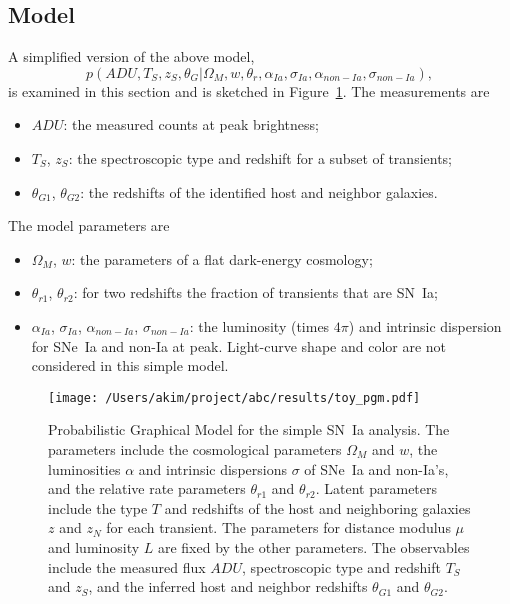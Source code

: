 \documentclass[preprint]{elsarticle}
\begin{document}
\subsection{Model}
\label{example:sec}
A simplified version of the above model,
\begin{equation}
p(\mathit{ADU}, {{T}}_S,{{z}}_S, \theta_G|  \Omega_M, w, \theta_r,\alpha_{Ia},\sigma_{Ia}, \alpha_{\mathit{non-Ia}},\sigma_{\mathit{non-Ia}}),
\end{equation}
is examined in this section and is sketched in Figure~\ref{toypgm:fig}.
The measurements are
\begin{itemize}
\item $\mathit{ADU}$: the measured counts at peak brightness;
\item ${{T}}_S$, ${{z}}_S$: the spectroscopic type and redshift for a subset of transients;
\item $\theta_{G1}$, $\theta_{G2}$: the redshifts of the identified host and neighbor
galaxies.
\end{itemize}
The model parameters are
\begin{itemize}
\item $\Omega_M$, $w$: the parameters of a flat dark-energy cosmology;
\item $\theta_{r1}$, $\theta_{r2}$:  for two redshifts the fraction of transients that are SN~Ia;
\item $\alpha_{Ia}$, $\sigma_{Ia}$, $\alpha_{\mathit{non-Ia}}$, $\sigma_{\mathit{non-Ia}}$:
the luminosity (times $4\pi$) and intrinsic dispersion for SNe~Ia and non-Ia at peak.
Light-curve shape and color are not considered in this simple model.
\end{itemize}

\begin{figure}[htbp] %
   \centering
   \texttt{[image: /Users/akim/project/abc/results/toy\_pgm.pdf]} 
   \caption{Probabilistic Graphical Model for the simple SN~Ia analysis. The
   parameters include the cosmological parameters $\Omega_M$ and $w$,
   the luminosities $\alpha$ and intrinsic dispersions $\sigma$ of SNe~Ia and non-Ia's,
   and the relative rate parameters $\theta_{r1}$ and $\theta_{r2}$.  Latent parameters
   include the type $T$ and redshifts of the host and neighboring galaxies $z$ and $z_N$
   for each transient.  The  parameters for distance modulus $\mu$ and
   luminosity $L$ are fixed by the other parameters.  The observables include the measured
   flux $\mathit{ADU}$, spectroscopic type and redshift $T_S$ and $z_S$, and
   the inferred host and neighbor redshifts $\theta_{G1}$ and $\theta_{G2}$.
   \label{toypgm:fig}}
\end{figure}
\end{document}
